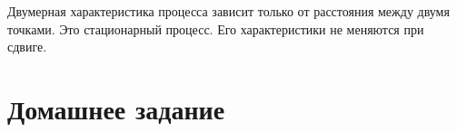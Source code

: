Двумерная характеристика процесса зависит только от расстояния между двумя точками.
Это стационарный процесс.
Его характеристики не меняются при сдвиге.

\section*{Домашнее задание}
